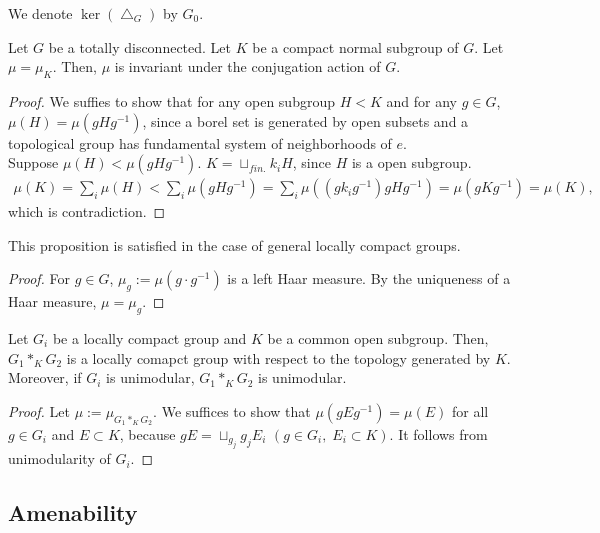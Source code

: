 \begin{definition}
  We denote $\ker(\bigtriangleup_G)$ by $G_0$.
\end{definition}

\begin{proposition}
  Let $G$ be a totally disconnected. 
  Let $K$ be a compact normal subgroup of $G$.
  Let $\mu = \mu_K$.
  Then, $\mu$ is invariant under the conjugation action of $G$.
\end{proposition}

\begin{proof}
  We suffies to show that for any open subgroup $H < K$ and for any $g \in G$, $\mu(H) = \mu(gHg^{-1})$,
  since a borel set is generated by open subsets and a topological group has fundamental system of neighborhoods of $e$. \\
  Suppose $\mu (H) < \mu(gHg^{-1})$.
  $K = \sqcup_{fin.}k_i H$, since $H$ is a open subgroup.
  \begin{align*}
    \mu(K) = \sum_i \mu(H)
    < \sum_i \mu(gHg^{-1})
    = \sum_i \mu((g k_i g^{-1})g H g^{-1})
    = \mu(gKg^{-1})
    = \mu(K), 
  \end{align*}
  which is contradiction.
\end{proof}

\begin{remark}
  This proposition is satisfied in the case of general locally compact groups.
\end{remark}

\begin{proof}
  For $g \in G$, $\mu_g := \mu(g \cdot g^{-1})$ is a left Haar measure.
  By the uniqueness of a Haar measure, $\mu = \mu_g$.
\end{proof}

\begin{proposition}
  Let $G_i$ be a locally compact group and $K$ be a common open subgroup.
  Then, $G_1 *_K G_2$ is a locally comapct group with respect to the topology generated by $K$.
  Moreover, if $G_i$ is unimodular, $G_1 *_K G_2$ is unimodular.
\end{proposition}

\begin{proof}
  Let $\mu := \mu_{G_1 *_K G_2}$.
  We suffices to show that $\mu(gEg^{-1}) = \mu(E)$ for all $g \in G_i$ and $E \subset K$,
  because $gE = \sqcup_{g_j}g_j E_i$ $(g \in G_i , \; E_i \subset K)$.
  It follows from unimodularity of $G_i$.
\end{proof}


\subsection{Amenability}


